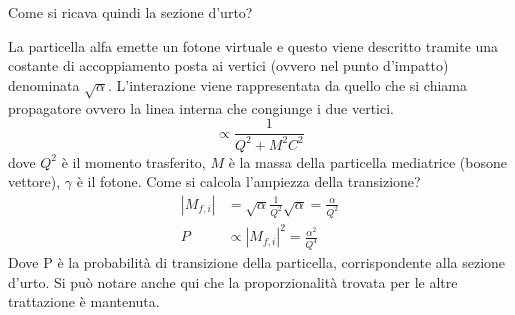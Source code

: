 Come si ricava quindi la sezione d'urto?

La particella alfa emette un fotone virtuale e questo viene descritto tramite una costante di accoppiamento posta ai vertici (ovvero nel punto d'impatto) denominata $\sqrt{\alpha}$. 
L'interazione viene rappresentata da quello che si chiama propagatore ovvero la linea interna che congiunge i due vertici.
\begin{equation}
\propto \frac{1}{Q^2+M^2C^2}
\end{equation}
dove $Q^2$ è il momento trasferito, $M$ è la massa della particella mediatrice (bosone vettore), $\gamma$ è il fotone.
Come si calcola l'ampiezza della transizione?
\begin{equation}
\begin{split}
|M_{f,i}| &=\sqrt{\alpha}\frac{1}{Q^2}\sqrt{\alpha}=\frac{\alpha}{Q^2}\\
P &\propto |M_{f,i}|^2 =\frac{\alpha^2}{Q^4}
\end{split}
\end{equation}
Dove P è la probabilità di transizione della particella, corrispondente alla sezione d'urto.
Si può notare anche qui che la proporzionalità trovata per le altre trattazione è mantenuta.


